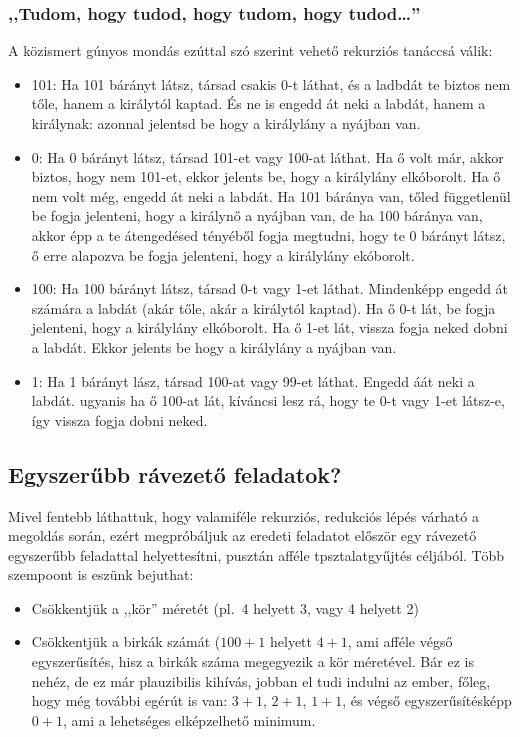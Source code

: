 \documentclass{article}
\begin{document}
	\subsubsection{,,Tudom, hogy tudod, hogy tudom, hogy tudod\dots''}

	A közismert gúnyos mondás ezúttal szó szerint vehető rekurziós tanáccsá válik:

	\begin{itemize}
		\item 101: Ha 101 bárányt látsz, társad csakis 0-t láthat, és a ladbdát te biztos nem tőle, hanem a királytól kaptad. És ne is engedd át neki a labdát, hanem a királynak: azonnal jelentsd be hogy a királylány a nyájban van.
		\item 0: Ha   0 bárányt látsz, társad 101-et vagy 100-at láthat. Ha ő volt már, akkor biztos, hogy nem 101-et, ekkor jelents be, hogy a királylány elkóborolt. Ha ő nem volt még, engedd át neki a labdát. Ha 101 báránya van, tőled függetlenül be fogja jelenteni, hogy a királynő a nyájban van, de ha 100 báránya van, akkor  épp a te átengedésed tényéből fogja megtudni, hogy te 0 bárányt látsz, ő erre alapozva be fogja jelenteni, hogy a királylány ekóborolt.
		\item 100: Ha 100 bárányt látsz, társad 0-t vagy 1-et láthat. Mindenképp engedd át számára a labdát (akár tőle, akár a királytól kaptad). Ha ő 0-t lát, be fogja jelenteni, hogy a királylány elkóborolt. Ha ő 1-et lát, vissza fogja neked dobni a labdát. Ekkor jelents be hogy a királylány a nyájban van.
		\item 1: Ha 1 bárányt lász, társad 100-at vagy 99-et láthat. Engedd áát neki a labdát. ugyanis ha ő 100-at lát, kíváncsi lesz rá, hogy te 0-t vagy 1-et látsz-e, így vissza fogja dobni neked.
	\end{itemize}

	\subsection{Egyszerűbb rávezető feladatok?}

	Mivel fentebb láthattuk, hogy valamiféle rekurziós, redukciós lépés várható a megoldás során, ezért megpróbáljuk az eredeti feladatot először egy rávezető egyszerűbb feladattal helyettesítni, pusztán afféle tpsztalatgyűjtés céljából. Több szempoont is eszünk bejuthat: 

	\begin{itemize}
		\item Csökkentjük a ,,kör'' méretét (pl.~4 helyett 3, vagy 4 helyett 2)
		\item Csökkentjük a birkák számát ($100 + 1$ helyett $4 +1$, ami afféle végső egyszerűsítés, hisz a birkák száma megegyezik a kör méretével. Bár ez is nehéz, de ez már plauzibilis kihívás, jobban el tudi indulni az ember, főleg, hogy még további egérút is van: $3 +1$, $2 + 1$, $1 + 1$, és végső egyszerűsítésképp $0 + 1$, ami a lehetséges elképzelhető minimum.
	\end{itemize}
\end{document}
